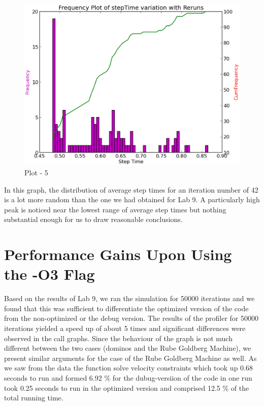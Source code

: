 \documentclass[11pt] {article}
\begin{document}
\begin {figure} [ht]
\begin {center}
\includegraphics[scale = 0.35] {6.eps}
\end {center}
\caption {Plot - 5}
\end {figure}

In this graph, the distribution of average step times for an iteration number of 42 is a lot more 
random than the one we had obtained for Lab 9. A particularly high peak is noticed near the lowest
range of average step times but nothing substantial enough for us to draw reasonable conclusions.

\section{Performance Gains Upon Using the -O3 Flag}

Based on the results of Lab 9, we ran the simulation for 50000 iterations and we found that this
was sufficient to differentiate the optimized version of the code from the non-optimized or the
debug version. The results of the profiler for 50000 iterations yielded a speed up of about 5 times
and significant differences were observed in the call graphs. Since the behaviour of the graph is
not much different between the two cases (dominos and the Rube Goldberg Machine), we present
similar arguments for the case of the Rube Goldberg Machine as well. As we saw from the data
the function solve velocity constraints which took up 0.68 seconds to run and formed 6.92 \% for 
the dubug-versiion of the code in one run took 0.25 seconds to run in the optimized version and 
comprised 12.5 \% of the total running time.
\end{document}
